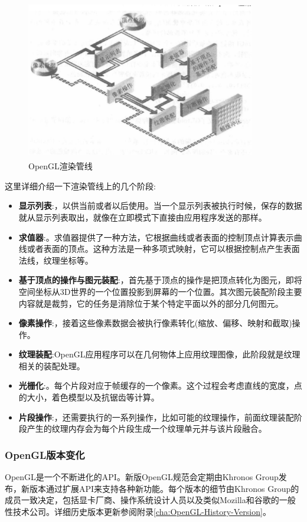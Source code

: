 \begin{figure}[H] 
  \centering
  \includegraphics[width=10cm,height=7cm]{figures/chap01/OpenGL-Pipeline}
  \caption{OpenGL渲染管线}
  \label{fig:OpenGL-Pipeline}
\end{figure}

这里详细介绍一下渲染管线上的几个阶段:
\begin{itemize}
\item{\textbf{显示列表}}:，以供当前或者以后使用。当一个显示列表被执行时候，保存的数据就从显示列表取出，就像在立即模式下直接由应用程序发送的那样。
\item{\textbf{求值器}}:。求值器提供了一种方法，它根据曲线或者表面的控制顶点计算表示曲线或者表面的顶点。这种方法是一种多项式映射，它可以根据控制点产生表面法线，纹理坐标等。
\item{\textbf{基于顶点的操作与图元装配}}:，首先基于顶点的操作是把顶点转化为图元，即将空间坐标从3D世界的一个位置投影到屏幕的一个位置。其次图元装配阶段主要内容就是裁剪，它的任务是消除位于某个特定平面以外的部分几何图元。
\item{\textbf{像素操作}}:，接着这些像素数据会被执行像素转化(缩放、偏移、映射和截取)操作。
\item{\textbf{纹理装配}}:\quad OpenGL应用程序可以在几何物体上应用纹理图像，此阶段就是纹理相关的装配处理。
\item{\textbf{光栅化}}:。每个片段对应于帧缓存的一个像素。这个过程会考虑直线的宽度，点的大小，着色模型以及抗锯齿等计算。
\item{\textbf{片段操作}}:，还需要执行的一系列操作，比如可能的纹理操作，前面纹理装配阶段产生的纹理内存会为每个片段生成一个纹理单元并与该片段融合。
\end{itemize}

\subsubsection{OpenGL版本变化}
OpenGL是一个不断进化的API。新版OpenGL规范会定期由Khronos Group发布，新版本通过扩展API来支持各种新功能。每个版本的细节由Khronos Group的成员一致决定，包括显卡厂商、操作系统设计人员以及类似Mozilla和谷歌的一般性技术公司。详细历史版本更新参阅附录\ref{cha:OpenGL-History-Version}。

